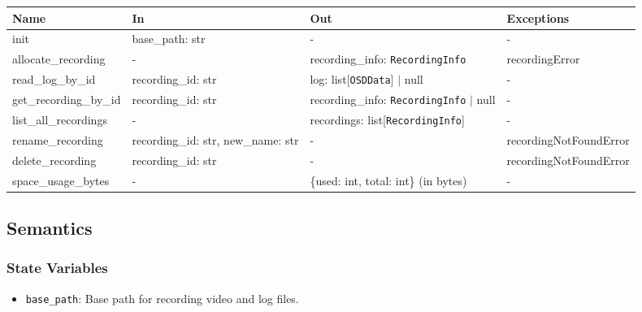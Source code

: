 \documentclass[12pt, titlepage]{article}
\begin{document}
\begin{center}
  \begin{tabular}{p{3cm} p{4cm} p{4cm} p{3.5cm}}
    \hline
    \textbf{Name}          & \textbf{In}                        & \textbf{Out}                                     & \textbf{Exceptions}    \\
    \hline
    init                   & base\_path: str                    & -                                                & -                      \\
    \hline
    allocate\_recording    & -                                  & recording\_info: \texttt{RecordingInfo}          & recordingError         \\
    \hline
    read\_log\_by\_id      & recording\_id: str                 & log: list[\texttt{OSDData}] $|$ null             & -                      \\
    \hline
    get\_recording\_by\_id & recording\_id: str                 & recording\_info: \texttt{RecordingInfo} $|$ null & -                      \\
    \hline
    list\_all\_recordings  & -                                  & recordings: list[\texttt{RecordingInfo}]         & -                      \\
    \hline
    rename\_recording      & recording\_id: str, new\_name: str & -                                                & recordingNotFoundError \\
    \hline
    delete\_recording      & recording\_id: str                 & -                                                & recordingNotFoundError \\
    \hline
    space\_usage\_bytes    & -                                  & \{used: int, total: int\} (in bytes)             & -                      \\
    \hline
  \end{tabular}
\end{center}

\subsection{Semantics}

\subsubsection{State Variables}

\begin{itemize}
  \item \texttt{base\_path}: Base path for recording video and log files.
\end{itemize}
\end{document}
